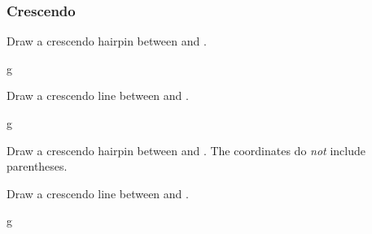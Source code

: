 \subsubsection{Crescendo}\label{sec:line:cresc-dim:cresc}
\begin{command}{\tmcrescendo{}}
  Draw a crescendo hairpin between  and .
\end{command}
\begin{codeexample}[]
\begin{tmline}
\begin{tmstaff}{g}{}
    
    
\end{tmstaff}
\end{tmline}
\end{codeexample}
\begin{command}{\tmcrescendo*{}}
  Draw a crescendo line between  and .
\end{command}
\begin{codeexample}[]
\begin{tmline}
  \begin{tmstaff}{g}{}
  \end{tmstaff}
\end{tmline}
\end{codeexample}
\begin{command}{\tmcrescendoline{}}
  Draw a crescendo hairpin between  and . 
  The coordinates do \emph{not} include parentheses.
\end{command}
\begin{command}{\tmcrescendoline*{}}
  Draw a crescendo line between  and .
\end{command}
\begin{codeexample}[]
\begin{tmline}
\begin{tmstaff}{g}{}
\end{tmstaff}
\end{tmline}
\end{codeexample}
